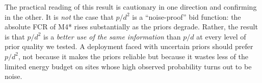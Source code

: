 The practical reading of this result is cautionary in one direction
and confirming in the other. It is \emph{not} the case that $p/d^2$
is a ``noise-proof'' bid function: the absolute FCR of M4* rises
substantially as the priors degrade. Rather, the result is that
$p/d^2$ is a \emph{better use of the same information} than $p/d$ at
every level of prior quality we tested. A deployment faced with
uncertain priors should prefer $p/d^2$, not because it makes the
priors reliable but because it wastes less of the limited energy
budget on sites whose high observed probability turns out to be
noise.
